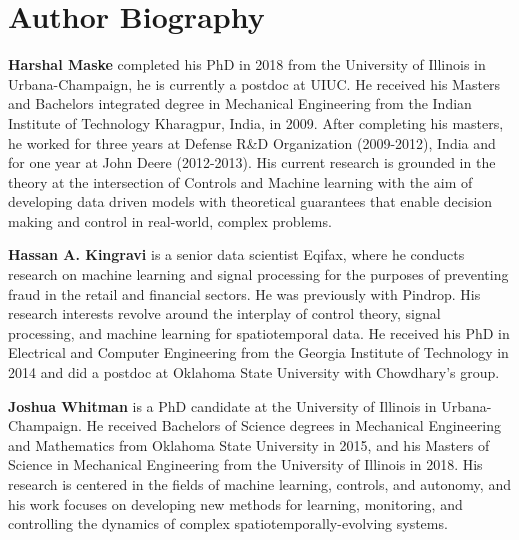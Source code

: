 \documentclass[letterpaper,12pt,peerreviewca,draftcls]{IEEEtran}
\begin{document}
\renewcommand{\thealgorithm}{S\arabic{algorithm}} 
\setcounter{algorithm}{0}

\clearpage


\clearpage

\processdelayedfloats

\clearpage

\processdelayedfloats




\newpage
\section{Author Biography}

\noindent \textbf{Harshal Maske} completed his PhD in 2018 from the University
of Illinois in Urbana-Champaign, he is currently a postdoc at UIUC. He received his Masters
and Bachelors integrated degree in Mechanical
Engineering from the Indian Institute of Technology
Kharagpur, India, in 2009. After completing his
masters, he worked for three years at Defense R\&D
Organization (2009-2012), India and for one year
at John Deere (2012-2013). His current research is
grounded in the theory at the intersection of Controls
and Machine learning with the aim of developing
data driven models with theoretical guarantees that
enable decision making and control in real-world, complex problems.

\noindent \textbf{Hassan A. Kingravi}  is a senior data scientist Eqifax, where he conducts research on machine
learning and signal processing for the purposes of
preventing fraud in the retail and financial sectors. He was previously with Pindrop.
His research interests revolve around the interplay
of control theory, signal processing, and machine
learning for spatiotemporal data. He received his PhD in Electrical and
Computer Engineering from the Georgia Institute
of Technology in 2014 and did a postdoc at Oklahoma State University with Chowdhary's group.



\noindent \textbf{Joshua Whitman} is a PhD candidate at the University of Illinois in Urbana-Champaign. He received Bachelors of Science degrees in Mechanical Engineering and Mathematics from Oklahoma State University in 2015, and his Masters of Science in Mechanical Engineering from the University of Illinois in 2018. His research is centered in the fields of machine learning, controls, and autonomy, and his work focuses on developing new methods for learning, monitoring, and controlling the dynamics of complex spatiotemporally-evolving systems.
\end{document}
